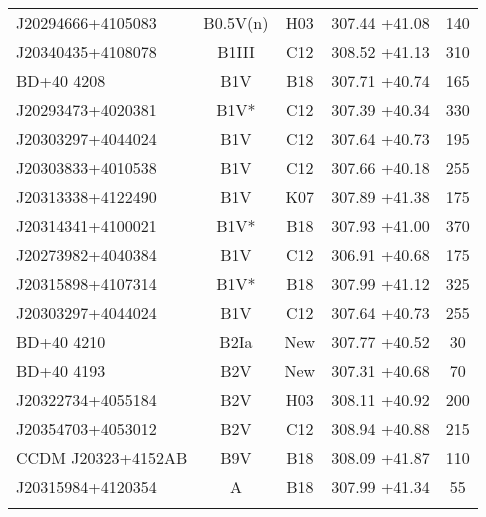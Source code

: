 \documentclass{aa} %
\begin{document}
\begin{appendix}
\begin{table*}[p!]
\begin{tabular}{lcccc}
\small{J20294666+4105083} & \small{B0.5V(n)} & \small{H03}& \small{307.44 +41.08} & \small{140} \\
\small{J20340435+4108078} & \small{B1III} & \small{C12} & \small{308.52 +41.13}& \small{310} \\	
\small{BD+40 4208 } & \small{B1V}  & \small{B18}& \small{307.71 +40.74}& \small{165} \\
\small{J20293473+4020381} & \small{B1V*} & \small{C12}& \small{307.39 +40.34}& \small{330}\\
\small{J20303297+4044024} & \small{B1V} & \small{C12}& \small{307.64 +40.73} & \small{195}\\
\small{J20303833+4010538} & \small{B1V} & \small{C12}& \small{307.66 +40.18} & \small{255}\\
\small{J20313338+4122490} & \small{B1V} & \small{K07}& \small{307.89 +41.38} & \small{175}\\
\small{J20314341+4100021} & \small{B1V*} & \small{B18} & \small{307.93 +41.00}  & \small{370}\\
\small{J20273982+4040384} & \small{B1V} & \small{C12}& \small{306.91 +40.68} & \small{175} \\
\small{J20315898+4107314} & \small{B1V*} & \small{B18} & \small{307.99 +41.12}  & \small{325}\\		
\small{J20303297+4044024} & \small{B1V} & \small{C12}& \small{307.64 +40.73} & \small{255} \\		
\small{BD+40 4210} & \small{B2Ia} & \small{New} & \small{307.77 +40.52}& \small{30} \\
\small{BD+40 4193 } & \small{B2V} & \small{New}& \small{307.31 +40.68}& \small{70}\\
\small{J20322734+4055184} & \small{B2V} & \small{H03} & \small{308.11 +40.92}& \small{200}\\ 		
\small{J20354703+4053012} & \small{B2V} & \small{C12} & \small{308.94 +40.88}& \small{215} \\	
\small{CCDM J20323+4152AB}& \small{B9V} & \small{B18}& \small{308.09 +41.87} & \small{110} \\	
\small{J20315984+4120354} & \small{A} & \small{B18} & \small{307.99 +41.34}  & \small{55}\\

\hline
\hline\\[-1.5ex]		 
		 		 		 
		\end{tabular}
\end{table*}			




\end{appendix}
\end{document}
